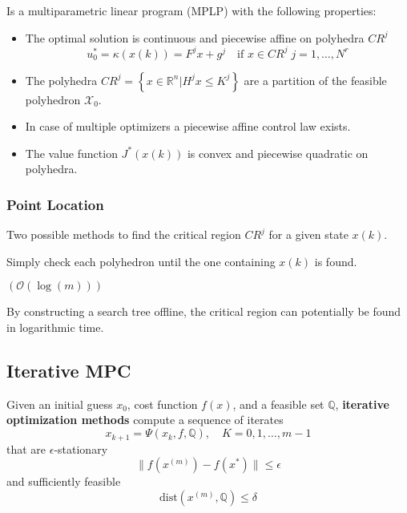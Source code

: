 Is a multiparametric linear program (MPLP) with the following properties:
\begin{itemize}
    \item The optimal solution is continuous and piecewise affine on polyhedra $CR^j$
          \begin{equation*}
              u_0^* = \kappa(x(k)) = F^j x + g^j \quad \text{if } x\in CR^j\; j=1,\ldots, N^r
          \end{equation*}
    \item The polyhedra $CR^j = \left\{ x\in \mathbb{R}^n \big| H^j x \leq K^j \right\}$ are a partition of the feasible polyhedron $\mathcal{X}_0$.
    \item In case of multiple optimizers a piecewise affine control law exists.
    \item The value function $J^*(x(k))$ is convex and piecewise quadratic on polyhedra.
\end{itemize}
\subsubsection{Point Location}

Two possible methods to find the critical region $CR^j$ for a given state $x(k)$.

\newpar{}
Simply check each polyhedron until the one containing $x(k)$ is found.

\newpar{}
 $(\mathcal{O}(\log(m)))$

By constructing a search tree offline, the critical region can potentially be found in logarithmic time.

\subsection{Iterative MPC}
Given an initial guess $x_0$, cost function $f(x)$, and a feasible set $\mathbb{Q}$, \textbf{iterative optimization methods} compute a sequence of iterates
\begin{equation*}
    x_{k+1} = \Psi(x_k, f, \mathbb{Q}),\quad K = 0,1,\ldots, m-1
\end{equation*}
that are $\epsilon$-stationary
\begin{equation*}
    \|f(x^{(m)}) - f(x^*)\| \leq \epsilon
\end{equation*}
and sufficiently feasible
\begin{equation*}
    \mathrm{dist}(x^{(m)},\mathbb{Q}) \leq \delta
\end{equation*}

